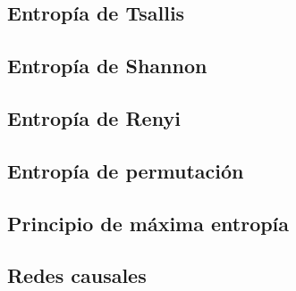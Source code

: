 \subsection{Entropía de Tsallis}

\subsection{Entropía de Shannon}

\subsection{Entropía de Renyi} 

\subsection{Entropía de permutación}

\subsection{Principio de máxima entropía}

\subsection{Redes causales}